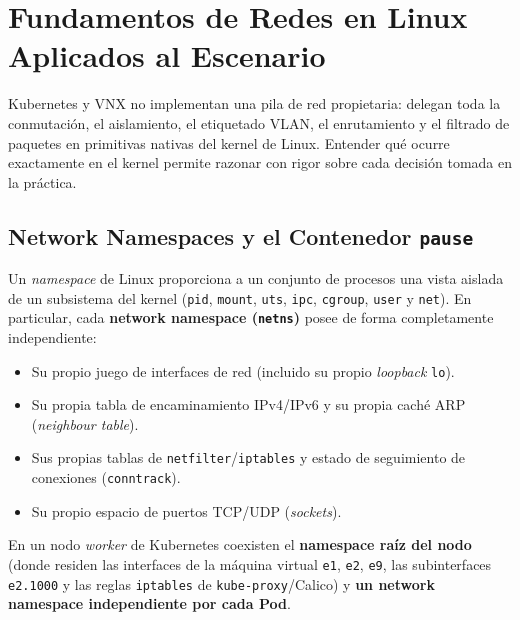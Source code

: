 \chapter{Fundamentos de Redes en Linux Aplicados al Escenario}

Kubernetes y VNX no implementan una pila de red propietaria: delegan toda la conmutación, el aislamiento, el etiquetado VLAN, el enrutamiento y el filtrado de paquetes en primitivas nativas del kernel de Linux. Entender qué ocurre exactamente en el kernel permite razonar con rigor sobre cada decisión tomada en la práctica.

\section{Network Namespaces y el Contenedor \texttt{pause}}

Un \textit{namespace} de Linux proporciona a un conjunto de procesos una vista aislada de un subsistema del kernel (\texttt{pid}, \texttt{mount}, \texttt{uts}, \texttt{ipc}, \texttt{cgroup}, \texttt{user} y \texttt{net}). En particular, cada \textbf{network namespace (\texttt{netns})} posee de forma completamente independiente:
\begin{itemize}
  \item Su propio juego de interfaces de red (incluido su propio \textit{loopback} \texttt{lo}).
  \item Su propia tabla de encaminamiento IPv4/IPv6 y su propia caché ARP (\textit{neighbour table}).
  \item Sus propias tablas de \texttt{netfilter}/\texttt{iptables} y estado de seguimiento de conexiones (\texttt{conntrack}).
  \item Su propio espacio de puertos TCP/UDP (\textit{sockets}).
\end{itemize}

En un nodo \textit{worker} de Kubernetes coexisten el \textbf{namespace raíz del nodo} (donde residen las interfaces de la máquina virtual \texttt{e1}, \texttt{e2}, \texttt{e9}, las subinterfaces \texttt{e2.1000} y las reglas \texttt{iptables} de \texttt{kube-proxy}/Calico) y \textbf{un network namespace independiente por cada Pod}.

